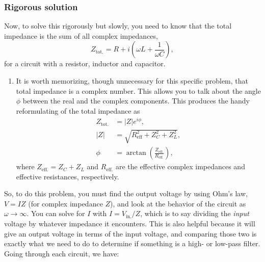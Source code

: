 \documentclass[11pt]{paper}
\begin{document}
\subsubsection*{Rigorous solution}
Now, to solve this rigorously but slowly, you need to know that the total impedance is the sum of all complex impedances,
\begin{equation}
Z_\text{tot.} = R + i\left(\omega L + \frac{1}{\omega C}\right),
\end{equation}
for a circuit with a resistor, inductor and capacitor.  
\begin{enumerate}[label=*]
\item It is worth memorizing, though unnecessary for this specific problem, that total impedance is a complex number.  This allows you to talk about the angle $\phi$ between the real and the complex components.  This produces the handy reformulating of the total impedance as
\begin{align}
Z_\text{tot.} &= \left|Z\right|e^{i\phi},\\
\left|Z\right|&=\sqrt{R_\text{eff}^2 + Z_C^2 + Z_L^2},\\
\phi &= \arctan \left( \frac{Z_\text{eff.}}{R_\text{eff.}}\right),
\end{align}
where $Z_\text{eff.} = Z_C + Z_L$ and $R_\text{eff.}$ are the effective complex impedances and effective resistances, respectively.
\end{enumerate}
So, to do this problem, you must find the output voltage by using Ohm's law, $V = IZ$ (for complex impedance $Z$), and look at the behavior of the circuit as $\omega \rightarrow \infty$.  You can solve for $I$ with $I = V_\text{in.}/Z$, which is to say dividing the \emph{input} voltage by whatever impedance it encounters.  This is also helpful because it will give an output voltage in terms of the input voltage, and comparing those two is exactly what we need to do to determine if something is a high- or low-pass filter.  Going through each circuit, we have:
\end{document}
